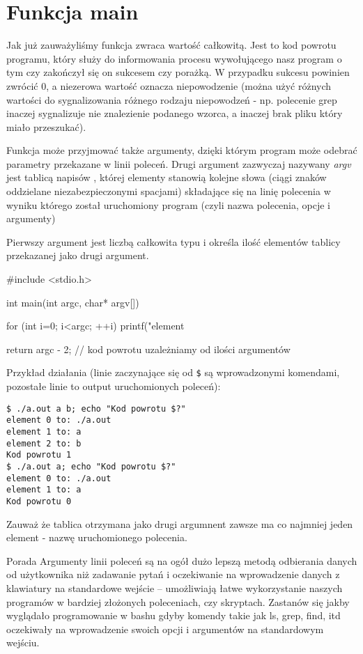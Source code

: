 
\section{Funkcja main}

Jak już zauważyliśmy funkcja  zwraca wartość całkowitą. Jest to kod powrotu programu, który służy do informowania procesu wywołującego nasz program o tym czy zakończył się on sukcesem czy porażką. W przypadku sukcesu powinien zwrócić 0, a niezerowa wartość oznacza niepowodzenie (można użyć różnych wartości do sygnalizowania różnego rodzaju niepowodzeń - np. polecenie grep inaczej sygnalizuje nie znalezienie podanego wzorca, a inaczej brak pliku który miało przeszukać).

Funkcja  może przyjmować także argumenty, dzięki którym program może odebrać parametry przekazane w linii poleceń.
Drugi argument zazwyczaj nazywany \textit{argv} jest tablicą napisów ,
	której elementy stanowią kolejne słowa (ciągi znaków oddzielane niezabezpieczonymi spacjami) składające się na linię polecenia w wyniku którego został uruchomiony program (czyli nazwa polecenia, opcje i argumenty)

Pierwszy argument jest liczbą całkowita typu  i określa ilość elementów tablicy przekazanej jako drugi argument.

\begin{CodeFrame*}[c]{}
#include <stdio.h>

int main(int argc, char* argv[]) {
	for (int i=0; i<argc; ++i)
		printf("element %
	
	return argc - 2; // kod powrotu uzależniamy od ilości argumentów
}
\end{CodeFrame*}

Przykład działania (linie zaczynające się od \Verb#$# są wprowadzonymi komendami, pozostałe linie to output uruchomionych poleceń):
\begin{Verbatim}
$ ./a.out a b; echo "Kod powrotu $?"
element 0 to: ./a.out
element 1 to: a
element 2 to: b
Kod powrotu 1
$ ./a.out a; echo "Kod powrotu $?"
element 0 to: ./a.out
element 1 to: a
Kod powrotu 0
\end{Verbatim}

Zauważ że tablica otrzymana jako drugi argumnent zawsze ma co najmniej jeden element - nazwę uruchomionego polecenia.

\begin{ProTip}{Porada}
Argumenty linii poleceń są na ogół dużo lepszą metodą odbierania danych od użytkownika niż zadawanie pytań i oczekiwanie na wprowadzenie danych z klawiatury na standardowe wejście – umożliwiają łatwe wykorzystanie naszych programów w bardziej złożonych poleceniach, czy skryptach. Zastanów się jakby wyglądało programowanie w bashu gdyby komendy takie jak ls, grep, find, itd oczekiwały na wprowadzenie swoich opcji i argumentów na standardowym wejściu.
\end{ProTip}
